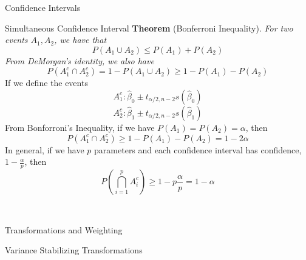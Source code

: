 \documentclass{article}
\begin{document}
\begin{multicols*}{3}
\begin{blackbox}{Confidence Intervals}
        \begin{redbox}{Simultaneous Confidence Interval}
            \textbf{Theorem} (Bonferroni Inequality). \textit{
                For two events $A_1, A_2$, we have that\\[-2ex]
                \[P(A_1 \cup A_2) \leq P(A_1) + P(A_2)\]
                From DeMorgan's identity, we also have \\[-2ex]
                \[P(A_1^c \cap A_2^c) = 1 - P(A_1 \cup A_2) \geq 1 - P(A_1) - P(A_2)\]
            }
            \noindent
            If we define the events \\[-2ex]
            \[A_1^c: \hat{\beta}_0 \pm t_{\alpha/2, n-2}s(\hat{\beta}_0)\]
            \[A_2^c: \hat{\beta}_1 \pm t_{\alpha/2, n-2}s(\hat{\beta}_1)\]
            From Bonforroni's Inequality, if we have $P(A_1) = P(A_2) = \alpha$, then \\[-2ex]
            \[P(A_1^c \cap A_2^c) \geq 1 - P(A_1) - P(A_2) = 1 - 2\alpha\]
            In general, if we have $p$ parameters and each confidence interval has confidence, $1- \frac{\alpha}{p}$, then \\[-2ex]
            \[P\left(\bigcap_{i=1}^p A_i^c\right) \geq 1 - p\frac{\alpha}{p} = 1 - \alpha\]
        \end{redbox}\\[-2ex]
    \end{blackbox}
    \begin{blackbox}{Transformations and Weighting}
        \begin{redbox}{Variance Stabilizing Transformations}

\end{redbox}
\end{blackbox}
\end{multicols*}
\end{document}
